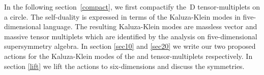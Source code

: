 \documentclass[a4paper,12pt]{article}
\begin{document}
  

\indent In the following  section~\ref{compact}, we first compactify the \coordHE{}\,D  tensor-multiplets  on a circle. The self-duality is expressed in terms of the Kaluza-Klein modes  in five-dimensional language. The  resulting Kaluza-Klein modes are massless vector and massive tensor multiplets which are identified by the analysis on five-dimensional supersymmetry algebra.  In section \ref{sec10} and \ref{sec20} we write our two proposed actions for the Kaluza-Klein modes of the \coordHE{} and \coordHE{} tensor-multiplets  respectively.  In section \ref{lift} we lift the actions to six-dimensions and discuss the symmetries. 
       

   

 
\end{document}
